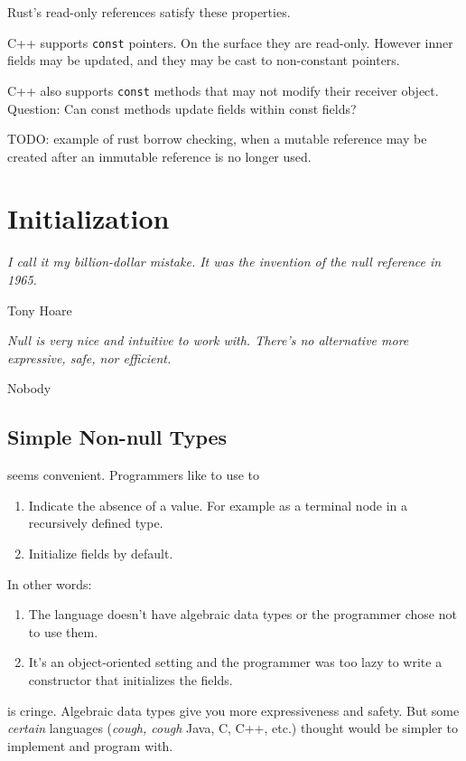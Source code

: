 \documentclass{article}
\begin{document}
Rust's read-only references satisfy these properties.

C++ supports \texttt{const} pointers.
On the surface they are read-only.
However inner fields may be updated, and they may be cast to non-constant pointers.

C++ also supports \texttt{const} methods that may not modify their receiver object.
Question: Can const methods update fields within const fields?

TODO: example of rust borrow checking, when a mutable reference may be created after an immutable reference is no longer used.

\section{Initialization}

\epigraph{\itshape I call it my billion-dollar mistake. It was the invention of the null reference in 1965.}{Tony Hoare}

\epigraph{\itshape Null is very nice and intuitive to work with. There's no alternative more expressive, safe, nor efficient.}{Nobody}

\subsection{Simple Non-null Types}

\cringe{} seems convenient.
Programmers like to use \cringe{} to
\begin{enumerate}
\item Indicate the absence of a value. For example as a terminal node in a recursively defined type.
\item Initialize fields by default.
\end{enumerate}

In other words:
\begin{enumerate}
\item The language doesn't have algebraic data types or the programmer chose not to use them.
\item It's an object-oriented setting and the programmer was too lazy to write a constructor that initializes the fields.
\end{enumerate}

\cringe{} is cringe.
Algebraic data types give you more expressiveness and safety.
But some \textit{certain} languages (\textit{cough, cough} Java, C, C++, etc.) thought \cringe{} would be simpler to implement and program with.
\end{document}
